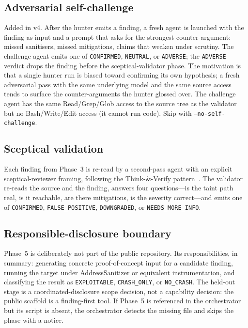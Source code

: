 \documentclass[11pt,a4paper]{article}
\begin{document}
\subsection{Adversarial self-challenge}
\label{sec:approach-challenge}

Added in v4. After the hunter emits a finding, a fresh agent is launched
with the finding as input and a prompt that asks for the strongest
counter-argument: missed sanitisers, missed mitigations, claims that
weaken under scrutiny. The challenge agent emits one of
\texttt{CONFIRMED}, \texttt{NEUTRAL}, or \texttt{ADVERSE}; the
\texttt{ADVERSE} verdict drops the finding before the sceptical-validator
phase. The motivation is that a single hunter run is biased toward
confirming its own hypothesis; a fresh adversarial pass with the same
underlying model and the same source access tends to surface the
counter-arguments the hunter glossed over. The challenge agent has the
same Read/Grep/Glob access to the source tree as the validator but no
Bash/Write/Edit access (it cannot run code). Skip with
\texttt{--no-self-challenge}.

\subsection{Sceptical validation}
\label{sec:approach-validator}

Each finding from Phase~3 is re-read by a second-pass agent with an
explicit sceptical-reviewer framing, following the Think-\&-Verify
pattern~\citep{vulnSage2025}. The validator re-reads the source and the
finding, answers four questions---is the taint path real, is it
reachable, are there mitigations, is the severity correct---and emits one
of \texttt{CONFIRMED}, \texttt{FALSE\_POSITIVE}, \texttt{DOWNGRADED}, or
\texttt{NEEDS\_MORE\_INFO}.

\subsection{Responsible-disclosure boundary}
\label{sec:approach-phase5}

Phase~5 is deliberately not part of the public repository. Its
responsibilities, in summary: generating concrete proof-of-concept
input for a candidate finding, running the target under
AddressSanitizer or equivalent instrumentation, and classifying the
result as \texttt{EXPLOITABLE}, \texttt{CRASH\_ONLY}, or
\texttt{NO\_CRASH}. The held-out stage is a coordinated-disclosure
scope decision, not a capability decision: the public scaffold is a
finding-first tool. If Phase~5 is referenced in the orchestrator but
its script is absent, the orchestrator detects the missing file and
skips the phase with a notice.
\end{document}
